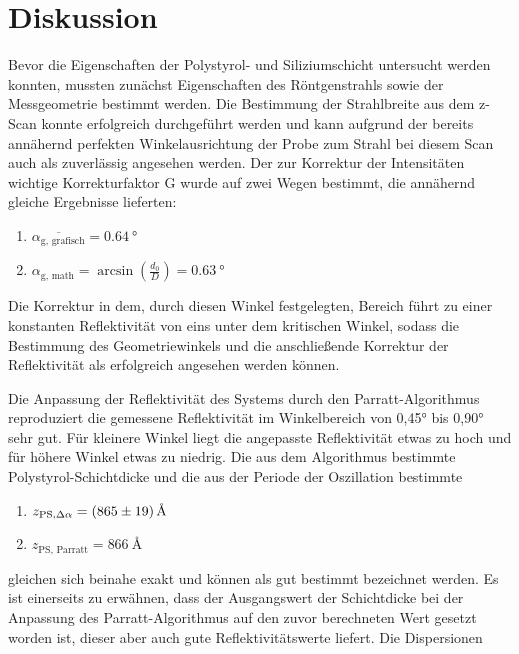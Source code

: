 \newpage
\section{Diskussion}
    Bevor die Eigenschaften der Polystyrol- und Siliziumschicht untersucht werden konnten, mussten zunächst Eigenschaften des Röntgenstrahls sowie der Messgeometrie bestimmt werden. Die Bestimmung der 
    Strahlbreite aus dem z-Scan konnte erfolgreich durchgeführt werden und kann aufgrund der bereits annähernd perfekten Winkelausrichtung der Probe zum Strahl bei diesem Scan auch als zuverlässig angesehen 
    werden. Der zur Korrektur der Intensitäten wichtige Korrekturfaktor G wurde auf zwei Wegen bestimmt, die annähernd gleiche Ergebnisse lieferten:
    
    \begin{enumerate}
      \item $\overline{\alpha_{\text{g, grafisch}}} = \SI{0.64}{\degree}$
      \item $\alpha_{\text{g, math}} = \arcsin\left(\frac{d_0}{D}\right) = \SI{0.63}{\degree}$
    \end{enumerate}

    Die Korrektur in dem, durch diesen Winkel festgelegten, Bereich führt zu einer konstanten Reflektivität von eins unter dem kritischen Winkel, sodass die Bestimmung des Geometriewinkels und die 
    anschließende Korrektur der Reflektivität als erfolgreich angesehen werden können.\newline

    Die Anpassung der Reflektivität des Systems durch den Parratt-Algorithmus reproduziert die gemessene Reflektivität im Winkelbereich von 0,45° bis 0,90° sehr gut. Für kleinere Winkel liegt die angepasste
    Reflektivität etwas zu hoch und für höhere Winkel etwas zu niedrig. Die aus dem Algorithmus bestimmte Polystyrol-Schichtdicke und die aus der Periode der Oszillation bestimmte 
    
    \begin{enumerate}
      \item $z_{\text{PS}, \Delta\alpha} = \SI{865+-19}{\angstrom}$
      \item $z_{\text{PS, Parratt}} = \SI{866}{\angstrom}$
    \end{enumerate}

    gleichen sich beinahe exakt und können als gut bestimmt bezeichnet werden. Es ist einerseits zu erwähnen, dass der Ausgangswert der Schichtdicke bei der Anpassung des Parratt-Algorithmus auf den zuvor
    berechneten Wert gesetzt worden ist, dieser aber auch gute Reflektivitätswerte liefert. Die Dispersionen 
    
